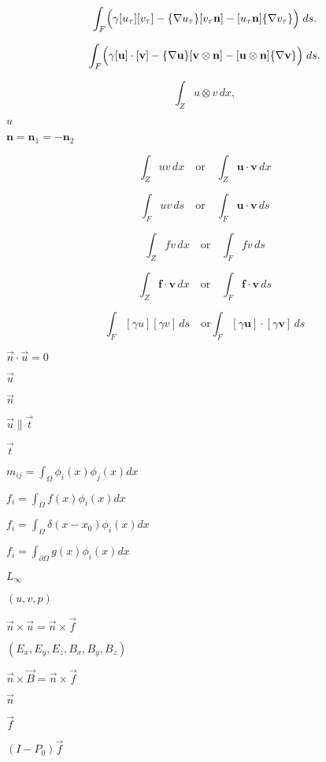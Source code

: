 \documentclass{article}
\begin{document}
\[ \int_F \Bigl( \gamma [u_\tau][v_\tau] - \{\nabla u_\tau\}[v_\tau\mathbf n] - [u_\tau\mathbf n]\{\nabla v_\tau\} \Bigr) \; ds. \]
\pagebreak

\[ \int_F \Bigl( \gamma [\mathbf u]\cdot[\mathbf v] - \{\nabla \mathbf u\}[\mathbf v\otimes \mathbf n] - [\mathbf u\otimes \mathbf n]\{\nabla \mathbf v\} \Bigr) \; ds. \]
\pagebreak

\[ \int_Z u \otimes v \,dx, \]
\pagebreak

$u$
\pagebreak

$\mathbf n = \mathbf n_1 = -\mathbf n_2$
\pagebreak

\[ \int_Z uv\,dx \quad \text{or} \quad \int_Z \mathbf u\cdot \mathbf v\,dx \]
\pagebreak

\[ \int_F uv\,ds \quad \text{or} \quad \int_F \mathbf u\cdot \mathbf v\,ds \]
\pagebreak

\[ \int_Z fv\,dx \quad \text{or} \quad \int_F fv\,ds \]
\pagebreak

\[ \int_Z \mathbf f\cdot \mathbf v\,dx \quad \text{or} \quad \int_F \mathbf f\cdot \mathbf v\,ds \]
\pagebreak

\[ \int_F [\gamma u][\gamma v]\,ds \quad \text{or} \int_F [\gamma \mathbf u]\cdot [\gamma \mathbf v]\,ds \]
\pagebreak

$\vec n \cdot \vec u = 0$
\pagebreak

$\vec u$
\pagebreak

$\vec n$
\pagebreak

$\vec u \| \vec t$
\pagebreak

$\vec t$
\pagebreak

$m_{ij} = \int_\Omega \phi_i(x) \phi_j(x) dx$
\pagebreak

$f_i = \int_\Omega f(x) \phi_i(x) dx$
\pagebreak

$f_i = \int_\Omega \delta(x-x_0) \phi_i(x) dx$
\pagebreak

$f_i = \int_{\partial\Omega} g(x) \phi_i(x) dx$
\pagebreak

$L_\infty$
\pagebreak

$(u,v,p)$
\pagebreak

$\vec{n}\times\vec{u}=\vec{n}\times\vec{f}$
\pagebreak

$(E_x,E_y,E_z,B_x,B_y,B_z)$
\pagebreak

$\vec{n}\times\vec{B}=\vec{n}\times\vec{f}$
\pagebreak

$\vec{n}$
\pagebreak

$\vec{f}$
\pagebreak

$(I-P_0)\vec{f}$
\pagebreak
\end{document}
